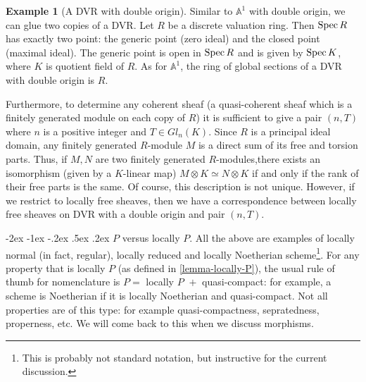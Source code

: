 \documentclass[11pt]{amsart}
\makeatletter
\renewcommand\subsection{\@startsection {subsection}{1}{\z@}%
	{-2ex \@plus -1ex \@minus -.2ex}%
	{.5ex \@plus.2ex}%
	{\normalfont\bfseries}}
\newcommand{\Spec}{{\rm Spec \,}}
\newcommand{\A}{{\mathbb A}}
\theoremstyle{definition}
\newtheorem{example}[theorem]{Example}
\makeatother
\begin{document}
\begin{example}[A DVR with double origin]
	\label{example-dvr-double-origin}
Similar to $\A^1$ with double origin, we can glue two copies of a DVR. Let $R$ be a discrete valuation ring. Then $\Spec R$ has exactly two point: the generic point (zero ideal) and the closed point (maximal ideal). The generic point is open in $\Spec R$ and is given by $\Spec K$, where $K$ is quotient field of $R$. As for $\A^1$, the ring of global sections of a DVR with double origin is $R$.

Furthermore, to determine any coherent sheaf (a quasi-coherent sheaf which is a finitely generated module on each copy of $R$) it is sufficient to give a pair $(n,T)$ where $n$ is a positive integer and $T\in Gl_n(K)$. Since $R$ is a principal ideal domain, any finitely generated $R$-module $M$ is a direct sum of its free and torsion parts. Thus, if $M, N$ are two finitely generated $R$-modules,there exists an isomorphism (given by a $K$-linear map) $M\otimes K \simeq N\otimes K$ if and only if the rank of their free parts is the same. Of course, this description is not unique. However, if we restrict to locally free sheaves, then we have a correspondence between locally free sheaves on DVR with a double origin and pair $(n,T)$.
\end{example}

\begin{comment}
\begin{tikzcd}[remember picture]
	A \arrow[r] & B\\
	C \arrow[r] & D\\
\end{tikzcd}
\begin{tikzpicture}[overlay,remember picture]
\path (\tikzcdmatrixname-2-1) to node[midway,sloped]{$\subseteq$}
(\tikzcdmatrixname-1-1);
\path (\tikzcdmatrixname-2-2) to node[midway,sloped]{$\subseteq$}
(\tikzcdmatrixname-1-2);
\end{tikzpicture}
\end{comment}

\subsection{\texorpdfstring{$P$}{P} versus locally \texorpdfstring{$P$}{P}.}
\label{subsection-P-versus-locallyP}
All the above are examples of locally normal (in fact, regular), locally reduced and locally Noetherian scheme\footnote{This is probably not standard notation, but instructive for the current discussion.}. For any property that is locally $P$ (as defined in \ref{lemma-locally-P}), the usual rule of thumb for nomenclature is $P=$ locally $P\,\,+$ quasi-compact: for example, a scheme is Noetherian if it is locally Noetherian and quasi-compact. Not all properties are of this type: for example quasi-compactness, sepratedness, properness, etc. We will come back to this when we discuss morphisms.
\end{document}
